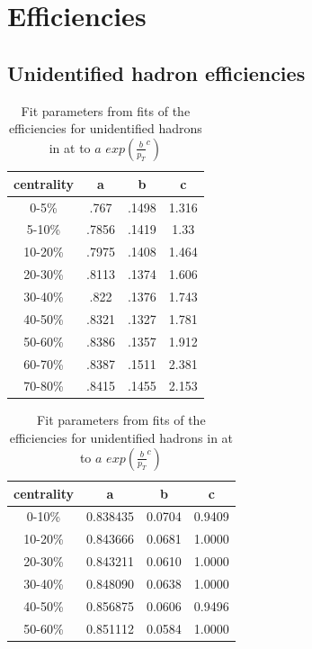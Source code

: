 \chapter{Efficiencies\label{efficiencyappendix}}


\section{Unidentified hadron efficiencies\label{hefficiencyappendix}}

\begin{table}
\begin{center}
\caption[Parameters from efficiency fits for unidentified hadrons in \Au collisions at \sNNsixtytwo]{Fit parameters from fits of the efficiencies for unidentified hadrons in \Au at \sNNsixtytwo to $a$  $exp(\frac{b}{p_T}^c)$}\label{AuAu62EfficiencyFitTable}
\begin{tabular}{c|c c c}
\hline
centrality & a & b & c \\ \hline
0-5\% & .767&.1498&1.316 \\
5-10\% & .7856&.1419&1.33 \\
10-20\% & .7975&.1408&1.464 \\
20-30\% & .8113&.1374&1.606 \\
30-40\% & .822&.1376&1.743 \\
40-50\% & .8321&.1327&1.781 \\
50-60\% & .8386&.1357&1.912 \\
60-70\% & .8387&.1511&2.381 \\
70-80\% & .8415&.1455&2.153 \\ \hline
\end{tabular}
\end{center}
\end{table}
% 
\begin{table}
\begin{center}
\caption[Parameters from efficiency fits for unidentified hadrons in \Cu collisions at \sNNsixtytwo]{Fit parameters from fits of the efficiencies for unidentified hadrons in \Au at \sNNsixtytwo to $a$  $exp(\frac{b}{p_T}^c)$}\label{CuCu62EfficiencyFitTable}
\begin{tabular}{c|c c c}
\hline
centrality & a & b & c \\ \hline
0-10\% & 0.838435  & 0.0704 & 0.9409\\
10-20\% & 0.843666 & 0.0681 & 1.0000\\
20-30\% & 0.843211 & 0.0610 & 1.0000\\
30-40\% & 0.848090 & 0.0638 & 1.0000\\
40-50\% & 0.856875 & 0.0606 & 0.9496\\
50-60\% & 0.851112 & 0.0584 & 1.0000\\ \hline
\end{tabular}
\end{center}
\end{table}

